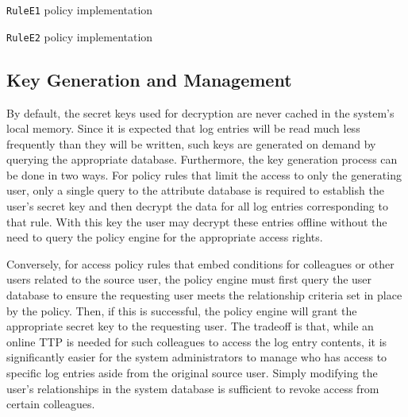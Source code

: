 \documentclass{sig-alternate}
\begin{document}
\begin{algorithm}[t] %
\caption{{\tt RuleE1} policy implementation} \label{alg:ruleE1}
\begin{algorithmic}[1]
\end{algorithmic}
\end{algorithm}

\begin{algorithm}[t] %
\caption{{\tt RuleE2} policy implementation} \label{alg:ruleE2}
\begin{algorithmic}[1]
\end{algorithmic}
\end{algorithm}

\subsection{Key Generation and Management}
By default, the secret keys used for decryption are never cached in the system's local memory. Since it is
expected that log entries will be read much less frequently than they will be written, such keys are generated
on demand by querying the appropriate database. Furthermore, the key generation process can be done in two ways. 
For policy rules that limit the access to only the generating user, only a single query to the attribute database
is required to establish the user's secret key and then decrypt the data for all log entries corresponding to that rule. 
With this key the user may decrypt these entries offline without the need to query the policy engine for the 
appropriate access rights.

Conversely, for access policy rules that embed conditions for colleagues or other users 
related to the source user, the policy engine must first query the
user database to ensure the requesting user meets the relationship criteria set in place by the policy. Then,
if this is successful, the policy engine will grant the appropriate secret key to the requesting user. The tradeoff
is that, while an online TTP is needed for such colleagues to access the log entry contents, it is significantly easier
for the system administrators to manage who has access to specific log entries aside from the original source user.
Simply modifying the user's relationships in the system database is sufficient to revoke access from certain colleagues.
\end{document}
